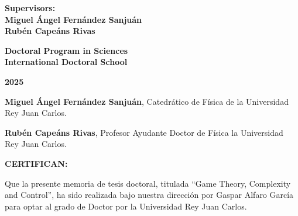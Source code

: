 \documentclass[a4paper,12pt]{newsiambook}
\newcommand{\clearemptydoublepage}{\newpage{\pagestyle{empty}\cleardoublepage}}
\begin{document}
\begin{center}
\vspace*{1cm}

\begin{center}
	{ \bf Supervisors: \\
		\vspace*{0.25cm}
		Miguel \'Angel Fern\'andez Sanju\'an\\
		\vspace*{0.25cm} 
		Rub\'en Cape\'ans Rivas}
\end{center}

\vspace*{1cm}

\begin{center}
	{\bf Doctoral Program in Sciences\\
		International Doctoral School}
\end{center} 

\vspace*{0.5cm}

\begin{center}
	{\bf \Large 2025}
\end{center}                         %

\end{center}

\clearemptydoublepage \frontmatter

\thispagestyle{empty}






\clearemptydoublepage


\noindent
\textbf{Miguel Ángel Fernández Sanjuán}, Catedrático de Física de la Universidad Rey Juan Carlos. 

\vspace*{0.5cm}

\noindent
\textbf{Rubén Capeáns Rivas}, Profesor Ayudante Doctor de Física la Universidad Rey Juan Carlos.


\vspace*{1.5cm}

\textbf{CERTIFICAN:}

\vspace*{1.5cm}

Que la presente memoria de tesis doctoral, titulada “Game Theory, Complexity and Control”, ha sido realizada bajo nuestra dirección por Gaspar Alfaro García para optar al grado de Doctor por la Universidad Rey Juan Carlos. 
\end{document}

